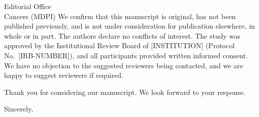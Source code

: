 \documentclass[11pt]{letter}
\begin{document}
\begin{letter}{Editorial Office\\Cancers (MDPI)}
We confirm that this manuscript is original, has not been published
previously, and is not under consideration for publication elsewhere, in
whole or in part. The authors declare no conflicts of interest. The study
was approved by the Institutional Review Board of [INSTITUTION]
(Protocol No.~[IRB-NUMBER]), and all participants provided written informed
consent. We have no objection to the suggested reviewers being contacted,
and we are happy to suggest reviewers if required.

Thank you for considering our manuscript. We look forward to your response.

\closing{Sincerely,}

\end{letter}
\end{document}

